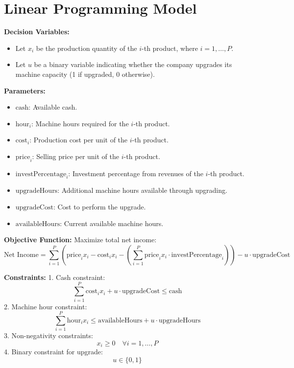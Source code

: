 \documentclass{article}
\begin{document}
\section*{Linear Programming Model}

\textbf{Decision Variables:}
\begin{itemize}
    \item Let \( x_i \) be the production quantity of the \( i \)-th product, where \( i = 1, \ldots, P \).
    \item Let \( u \) be a binary variable indicating whether the company upgrades its machine capacity (1 if upgraded, 0 otherwise).
\end{itemize}

\textbf{Parameters:}
\begin{itemize}
    \item \( \text{cash} \): Available cash.
    \item \( \text{hour}_i \): Machine hours required for the \( i \)-th product.
    \item \( \text{cost}_i \): Production cost per unit of the \( i \)-th product.
    \item \( \text{price}_i \): Selling price per unit of the \( i \)-th product.
    \item \( \text{investPercentage}_i \): Investment percentage from revenues of the \( i \)-th product.
    \item \( \text{upgradeHours} \): Additional machine hours available through upgrading.
    \item \( \text{upgradeCost} \): Cost to perform the upgrade.
    \item \( \text{availableHours} \): Current available machine hours.
\end{itemize}

\textbf{Objective Function:}
Maximize total net income:
\[
\text{Net Income} = \sum_{i=1}^{P} \left( \text{price}_i x_i - \text{cost}_i x_i - \left( \sum_{i=1}^{P} \text{price}_i x_i \cdot \text{investPercentage}_i \right) \right) - u \cdot \text{upgradeCost}
\]

\textbf{Constraints:}
1. Cash constraint:
\[
\sum_{i=1}^{P} \text{cost}_i x_i + u \cdot \text{upgradeCost} \leq \text{cash}
\]
2. Machine hour constraint:
\[
\sum_{i=1}^{P} \text{hour}_i x_i \leq \text{availableHours} + u \cdot \text{upgradeHours}
\]
3. Non-negativity constraints:
\[
x_i \geq 0 \quad \forall i = 1, \ldots, P
\]
4. Binary constraint for upgrade:
\[
u \in \{0, 1\}
\]
\end{document}

